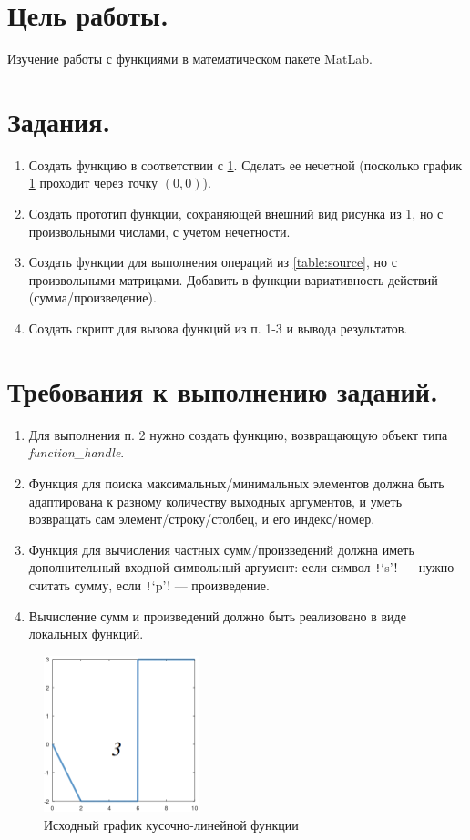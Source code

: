 \section*{Цель работы.}
Изучение работы с функциями в математическом пакете MatLab.

\section*{Задания.}
\begin{enumerate}
    \item Создать функцию в соответствии с \cref{fig:source}. Сделать ее нечетной (посколько график \cref{fig:source} проходит через точку $(0, 0)$).
    \item Создать прототип функции, сохраняющей внешний вид рисунка из \cref{fig:source}, но с произвольными числами, с учетом нечетности.
    \item Создать функции для выполнения операций из \cref{table:source}, но с произвольными матрицами. Добавить в функции вариативность действий (сумма/произведение).
    \item Создать скрипт для вызова функций из п. 1-3 и вывода результатов.
\end{enumerate}

\section*{Требования к выполнению заданий.}
\begin{enumerate}
    \item Для выполнения п. 2 нужно создать функцию, возвращающую объект типа \textit{function\_handle}.
    \item Функция для поиска максимальных/минимальных элементов должна быть адаптирована к разному количеству выходных аргументов, и уметь возвращать сам элемент/строку/столбец, и его индекс/номер.
    \item Функция для вычисления частных сумм/произведений должна иметь дополнительный входной символьный аргумент: если символ \texttt!‘s’! --- нужно считать сумму, если \texttt!‘p’! --- произведение.
    \item Вычисление сумм и произведений должно быть реализовано в виде локальных функций.
\end{enumerate}

\begin{figure}[b]
    \centering
    \includegraphics[width=0.4\textwidth]{figs/source.png}
    \caption{Исходный график кусочно-линейной функции}
    \label{fig:source}
\end{figure}


